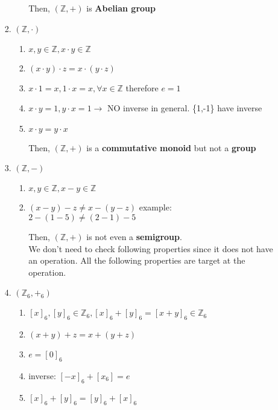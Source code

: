 \documentclass[12pt]{article}
\begin{document}
\begin{enumerate}
\begin{enumerate}
\begin{enumerate}
\begin{enumerate}
                Then, $(\mathbb{Z}, + )$ is \textbf{Abelian group}
            \end{enumerate}
            \item $(\mathbb{Z}, \cdot )$
            \begin{enumerate}
                \item $x,y \in \mathbb{Z}, x\cdot y \in \mathbb{Z}$
                \item $(x\cdot y)\cdot z = x\cdot (y\cdot z)$
                \item $x \cdot 1 = x, 1 \cdot x = x, \forall x \in \mathbb{Z}$ therefore $e = 1$
                \item $x \cdot y =1, y \cdot x = 1 \rightarrow$ NO inverse in general. \{1,-1\} have inverse
                \item $x \cdot y = y \cdot x$
                
                Then, $(\mathbb{Z}, + )$ is a \textbf{commutative monoid} but not a \textbf{group}
            \end{enumerate}
            \item  $(\mathbb{Z}, - )$
            \begin{enumerate}
                \item $x,y \in \mathbb{Z}, x-y \in \mathbb{Z}$
                \item $(x-y)-z \ne x-(y-z)$ example: $2 - (1 - 5) \ne (2 - 1) - 5$
                
                Then, $(\mathbb{Z}, + )$ is not even a \textbf{semigroup}.\\
                We don't need to check following properties since it does not have an operation. All the following properties are target at the operation.
            \end{enumerate}
            \item  $(\mathbb{Z}_6, +_6)$
            \begin{enumerate}
                \item $[x]_6,[y]_6 \in \mathbb{Z}_6, [x]_6+[y]_6  = [x+y]_6\in \mathbb{Z}_6$
                \item $(x+y)+z = x+(y+z)$
                \item $e = [0]_6$
                \item inverse: $[-x]_6 + [x_6] = e$
                \item $[x]_6+[y]_6  =[y]_6+[x]_6 $
                

\end{enumerate}
\end{enumerate}
\end{enumerate}
\end{enumerate}
\end{document}
